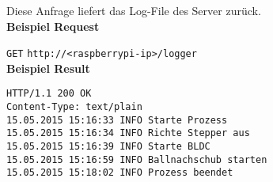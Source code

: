 Diese Anfrage liefert das Log-File des Server zurück.\\

\textbf{Beispiel Request}

\texttt{GET} 
\texttt{http://<raspberrypi-ip>/logger}\\

\textbf{Beispiel Result}

\begin{lstlisting}[caption=POST camera Response, tabsize=2]
HTTP/1.1 200 OK
Content-Type: text/plain
15.05.2015 15:16:33 INFO Starte Prozess
15.05.2015 15:16:34 INFO Richte Stepper aus
15.05.2015 15:16:39 INFO Starte BLDC
15.05.2015 15:16:59 INFO Ballnachschub starten
15.05.2015 15:18:02 INFO Prozess beendet
\end{lstlisting}

